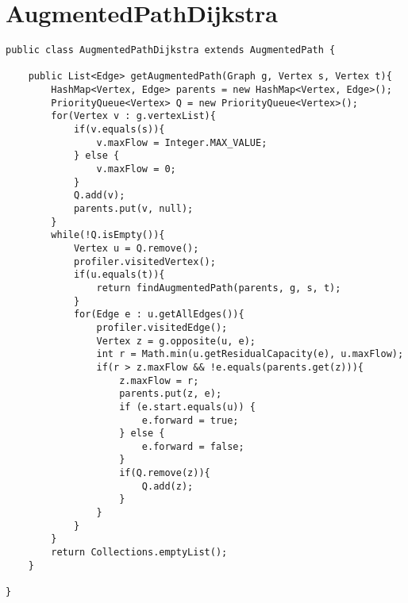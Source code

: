 \chapter{AugmentedPathDijkstra}
\lstset{language=Java}
\begin{lstlisting}[caption=AugmentedPathDijkstra Source Code]
public class AugmentedPathDijkstra extends AugmentedPath {

	public List<Edge> getAugmentedPath(Graph g, Vertex s, Vertex t){
		HashMap<Vertex, Edge> parents = new HashMap<Vertex, Edge>();
		PriorityQueue<Vertex> Q = new PriorityQueue<Vertex>();
		for(Vertex v : g.vertexList){
			if(v.equals(s)){
				v.maxFlow = Integer.MAX_VALUE;
			} else {
				v.maxFlow = 0;
			}
			Q.add(v);
			parents.put(v, null);
		}
		while(!Q.isEmpty()){
			Vertex u = Q.remove();
			profiler.visitedVertex();
			if(u.equals(t)){
				return findAugmentedPath(parents, g, s, t);
			}
			for(Edge e : u.getAllEdges()){
				profiler.visitedEdge();
				Vertex z = g.opposite(u, e);
				int r = Math.min(u.getResidualCapacity(e), u.maxFlow);
				if(r > z.maxFlow && !e.equals(parents.get(z))){
					z.maxFlow = r;
					parents.put(z, e);
					if (e.start.equals(u)) {
						e.forward = true;
					} else {
						e.forward = false;
					}
					if(Q.remove(z)){
						Q.add(z);
					}
				}
			}
		}
		return Collections.emptyList();
	}
	
}
\end{lstlisting}